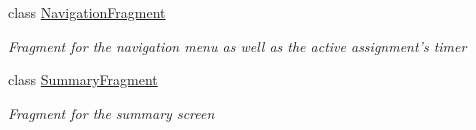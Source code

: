 \begin{DoxyCompactItemize}
class \hyperlink{class_field_service_1_1_android_1_1_fragments_1_1_navigation_fragment}{Navigation\+Fragment}
\begin{DoxyCompactList}\small\item\em Fragment for the navigation menu as well as the active assignment's timer \end{DoxyCompactList}\item 
class \hyperlink{class_field_service_1_1_android_1_1_fragments_1_1_summary_fragment}{Summary\+Fragment}
\begin{DoxyCompactList}\small\item\em Fragment for the summary screen \end{DoxyCompactList}\end{DoxyCompactItemize}

